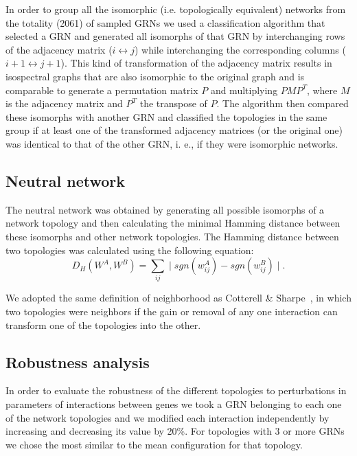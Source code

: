 \documentclass[10pt,letterpaper]{article}
\begin{document}
In order to group all the isomorphic (i.e. topologically equivalent) networks from
the totality (2061) of sampled GRNs we used a
classification algorithm that selected a GRN and generated all
isomorphs of that GRN by interchanging rows of the adjacency matrix
($i \leftrightarrow j$) while interchanging the corresponding columns
($i+1 \leftrightarrow j+1$). This kind of transformation of the adjacency
matrix results in isospectral graphs that are also isomorphic to the
original graph and is comparable to generate a permutation matrix $P$ and
multiplying $PMP^{T}$, where $M$ is the adjacency matrix and $P^{T}$ the
transpose of $P$. The algorithm then compared these isomorphs with another
GRN and classified the topologies in the same group if at least one of the
transformed adjacency matrices (or the original one) was identical to that
of the other GRN, i. e., if they were isomorphic networks.

\subsection*{Neutral network}

The neutral network was obtained by generating all possible isomorphs of a
network topology and then calculating the minimal Hamming distance between these
isomorphs and other network topologies. The Hamming distance between two
topologies was calculated using the following equation:
\begin{equation}
 D_H(W^A, W^B) = \sum_{ij} \mid sgn(w_{ij}^A) - sgn(w^B_{ij}) \mid .
\end{equation}

We adopted the same definition of neighborhood as Cotterell \&
Sharpe~\cite{Cotterell2010}, in which two topologies were neighbors if the gain or
removal of any one interaction can transform one of the topologies into the
other.

\subsection*{Robustness analysis}

In order to evaluate the robustness of the different topologies to perturbations
in parameters of interactions between genes we took a GRN belonging to each one
of the network topologies and we modified each interaction independently by
increasing and decreasing its value by 20\%. For topologies with 3 or more
GRNs we chose the most similar to the mean configuration for that topology.\\
\end{document}
